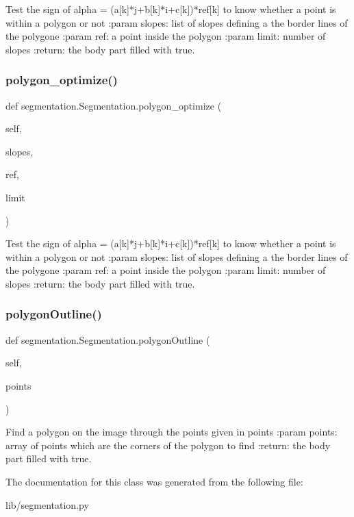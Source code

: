 \begin{DoxyVerb}Test the sign of alpha = (a[k]*j+b[k]*i+c[k])*ref[k]
to know whether a point is within a polygon or not
:param slopes: list of slopes defining a the border lines of the polygone
:param ref:  a point inside the polygon
:param limit: number of slopes
:return: the body part filled with true.
\end{DoxyVerb}
 \mbox{\label{classsegmentation_1_1_segmentation_a3fe70a2d840350c65e39d2f3938826bf}} 
\subsubsection{polygon\+\_\+optimize()}
{\footnotesize\ttfamily def segmentation.\+Segmentation.\+polygon\+\_\+optimize (\begin{DoxyParamCaption}\item[{}]{self,  }\item[{}]{slopes,  }\item[{}]{ref,  }\item[{}]{limit }\end{DoxyParamCaption})}

\begin{DoxyVerb}Test the sign of alpha = (a[k]*j+b[k]*i+c[k])*ref[k]
to know whether a point is within a polygon or not
:param slopes: list of slopes defining a the border lines of the polygone
:param ref:  a point inside the polygon
:param limit: number of slopes
:return: the body part filled with true.
\end{DoxyVerb}
 \mbox{\label{classsegmentation_1_1_segmentation_a13657232294fa4956ad7426d18ebfab4}} 
\subsubsection{polygon\+Outline()}
{\footnotesize\ttfamily def segmentation.\+Segmentation.\+polygon\+Outline (\begin{DoxyParamCaption}\item[{}]{self,  }\item[{}]{points }\end{DoxyParamCaption})}

\begin{DoxyVerb}Find a polygon on the image through the points given in points
:param points: array of points which are the corners of the polygon to find
:return:  the body part filled with true.
\end{DoxyVerb}
 

The documentation for this class was generated from the following file\+:\begin{DoxyCompactItemize}
\item 
lib/segmentation.\+py\end{DoxyCompactItemize}
